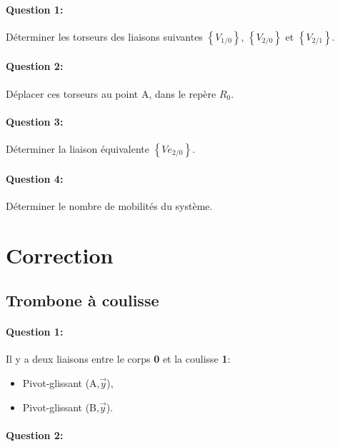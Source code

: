 \paragraph{Question 1:} Déterminer les torseurs des liaisons suivantes $\left\{V_{1/0}\right\}$, $\left\{V_{2/0}\right\}$ et $\left\{V_{2/1}\right\}$.

\paragraph{Question 2:} Déplacer ces torseurs au point A, dans le repère $R_0$.

\paragraph{Question 3:} Déterminer la liaison équivalente $\left\{Ve_{2/0}\right\}$.

\paragraph{Question 4:} Déterminer le nombre de mobilités du système.

\ifdef{\public}{}{}

\newpage

\pagestyle{correction}

\section{Correction}

\subsection{Trombone à coulisse}

\paragraph{Question 1:} Il y a deux liaisons entre le corps \textbf{0} et la coulisse \textbf{1}:
\begin{itemize}
 \item Pivot-glissant (A,$\overrightarrow{y}$),
 \item Pivot-glissant (B,$\overrightarrow{y}$).
\end{itemize}

\paragraph{Question 2:} ~\ \\

